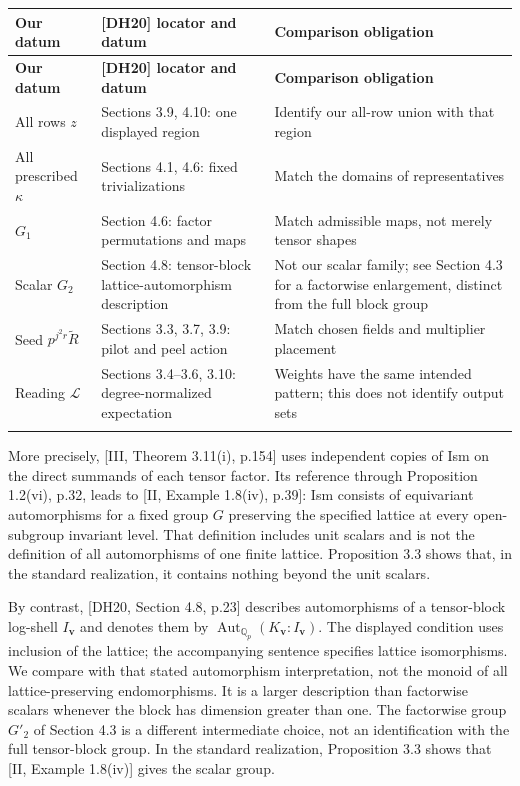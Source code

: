 \documentclass[11pt,a4paper]{amsart}
\begin{document}
\Needspace{130pt}
{\footnotesize
\setlength{\tabcolsep}{4pt}
\begin{longtable}{@{}P{0.2\textwidth}P{0.44\textwidth}P{0.29\textwidth}@{}}
\toprule
\textbf{Our datum} & \textbf{[DH20] locator and datum} & \textbf{Comparison obligation}\\\midrule
\endfirsthead
\toprule
\textbf{Our datum} & \textbf{[DH20] locator and datum} & \textbf{Comparison obligation}\\\midrule
\endhead
\bottomrule\endfoot
All rows $z$ & Sections 3.9, 4.10: one displayed region & Identify our all-row union with that region\\\addlinespace[3pt]
All prescribed $\kappa$ & Sections 4.1, 4.6: fixed trivializations & Match the domains of representatives\\\addlinespace[3pt]
$G_1$ & Section 4.6: factor permutations and maps & Match admissible maps, not merely tensor shapes\\\addlinespace[3pt]
Scalar $G_2$ & Section 4.8: tensor-block lattice-automorphism description & Not our scalar family; see Section 4.3 for a factorwise enlargement, distinct from the full block group\\\addlinespace[3pt]
Seed $p^{j^2r}\widetilde R$ & Sections 3.3, 3.7, 3.9: pilot and peel action & Match chosen fields and multiplier placement\\\addlinespace[3pt]
Reading $\mathcal L$ & Sections 3.4--3.6, 3.10: degree-normalized expectation & Weights have the same intended pattern; this does not identify output sets\\\addlinespace[3pt]
\end{longtable}
}


More precisely, [III, Theorem 3.11(i), p.154] uses independent copies of Ism on the direct summands of each tensor factor. Its reference through Proposition 1.2(vi), p.32, leads to [II, Example 1.8(iv), p.39]: Ism consists of equivariant automorphisms for a fixed group $G$ preserving the specified lattice at every open-subgroup invariant level. That definition includes unit scalars and is not the definition of all automorphisms of one finite lattice. Proposition 3.3 shows that, in the standard realization, it contains nothing beyond the unit scalars.


By contrast, [DH20, Section 4.8, p.23] describes automorphisms of a tensor-block log-shell $I_{\mathbf v}$ and denotes them by $\operatorname{Aut}_{\mathbb Q_p}(K_{\mathbf v}:I_{\mathbf v})$. The displayed condition uses inclusion of the lattice; the accompanying sentence specifies lattice isomorphisms. We compare with that stated automorphism interpretation, not the monoid of all lattice-preserving endomorphisms. It is a larger description than factorwise scalars whenever the block has dimension greater than one. The factorwise group $G'_2$ of Section 4.3 is a different intermediate choice, not an identification with the full tensor-block group. In the standard realization, Proposition 3.3 shows that [II, Example 1.8(iv)] gives the scalar group.
\end{document}
